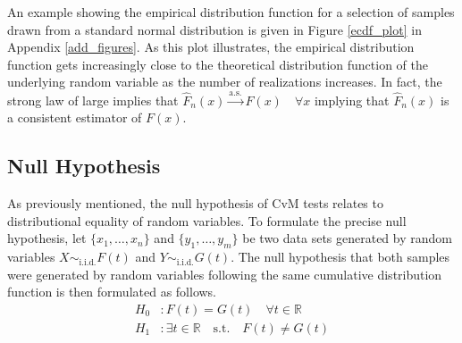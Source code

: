 \documentclass[12pt, a4paper]{article}
\theoremstyle{MAstyle} \newtheorem{assumption}{Assumption}[section]
\theoremstyle{MAstyle} \newtheorem{definition}{Definition}[section]
\theoremstyle{MAstyle} \newtheorem{theorem}{Theorem}[section]
\begin{document}
			An example showing the empirical distribution function for a selection of samples drawn from a standard normal distribution is given in Figure \ref{ecdf_plot} in Appendix \ref{add_figures}. As this plot illustrates, the empirical distribution function gets increasingly close to the theoretical distribution function of the underlying random variable as the number of realizations increases. In fact, the strong law of large implies that $\hat{F}_n(x) \stackrel{\text{a.s.}}{\rightarrow} F(x) \quad  \forall x$ implying that $\hat{F}_n(x)$ is a consistent estimator of $F(x)$.
			
		\subsection{Null Hypothesis}
			As previously mentioned, the null hypothesis of CvM tests relates to distributional equality of random variables. 
			To formulate the precise null hypothesis, let $\{x_1, \dots , x_n\}$ and $\{y_1, \dots , y_m\}$ be two data sets generated by random variables $X \sim_{\text{i.i.d.}} F(t)$ and $Y \sim_{\text{i.i.d.}} G(t)$.
			The null hypothesis that both samples were generated by random variables following the same cumulative distribution function is then formulated as follows.
			\begin{equation}
				\begin{split}
					H_0&: F(t) = G(t) \quad \forall t \in \mathbb{R}\\
					H_1&: \exists t \in \mathbb{R} \quad \text{s.t.} \quad F(t) \neq G(t)
				\end{split}
			\end{equation}
				
			
\end{document}
